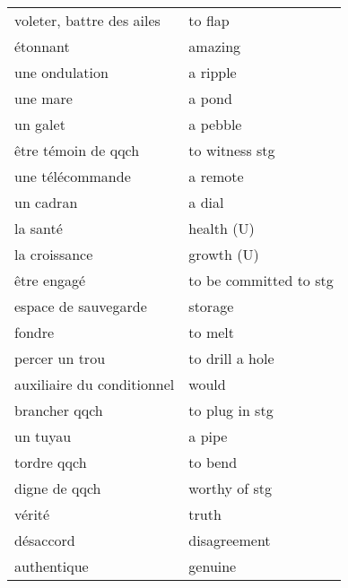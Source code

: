 \documentclass[
  10pt,
]{article}
\begin{document}
\begin{longtable}{ll}
voleter, battre des ailes & to flap\\

\rowcolor{gray!6}  étonnant & amazing\\

une ondulation & a ripple\\

\rowcolor{gray!6}  une mare & a pond\\

un galet & a pebble\\

\rowcolor{gray!6}  être témoin de qqch & to witness stg\\

une télécommande & a remote\\

\rowcolor{gray!6}  un cadran & a dial\\

la santé & health (U)\\

\rowcolor{gray!6}  la croissance & growth (U)\\

être engagé & to be committed to stg\\

\rowcolor{gray!6}  espace de sauvegarde & storage\\

fondre & to melt\\

\rowcolor{gray!6}  percer un trou & to drill a hole\\

auxiliaire du conditionnel & would\\

\rowcolor{gray!6}  brancher qqch & to plug in stg\\

un tuyau & a pipe\\

\rowcolor{gray!6}  tordre qqch & to bend\\

digne de qqch & worthy of stg\\

\rowcolor{gray!6}  vérité & truth\\

désaccord & disagreement\\

\rowcolor{gray!6}  authentique & genuine\\


\end{longtable}
\end{document}
